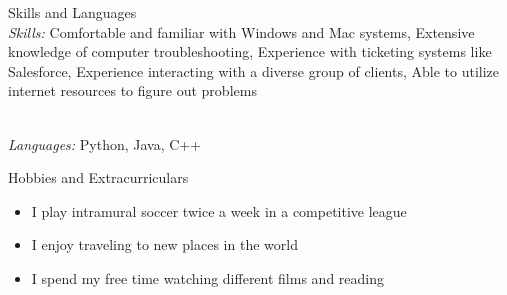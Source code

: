 \documentclass{resume}
\begin{document}
\begin{rSection} {Skills and Languages}
\\{\it Skills:} Comfortable and familiar with Windows and Mac systems, Extensive knowledge of computer troubleshooting,
Experience with ticketing systems like Salesforce, Experience interacting with a diverse group of clients, Able to utilize internet resources to figure out problems

\\{\it Languages:} Python, Java, C++

\end{rSection}

\begin{rSection}{Hobbies and Extracurriculars}
\begin{itemize}
    \item I play intramural soccer twice a week in a competitive league
    \item I enjoy traveling to new places in the world
    \item I spend my free time watching different films and reading
\end{itemize}


\end{rSection}
\end{document}
